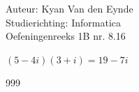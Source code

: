\documentclass[a4paper]{article}
\begin{document}
  
\noindent \large Auteur: Kyan Van den Eynde \\
\noindent \large Studierichting: Informatica\\
\noindent \large Oefeningenreeks 1B nr. 8.16\\

\medskip

\normalsize

$(5-4i)(3+i) = 19-7i$\\

\begin{thebibliography}{999}
\end{thebibliography}
\end{document}
